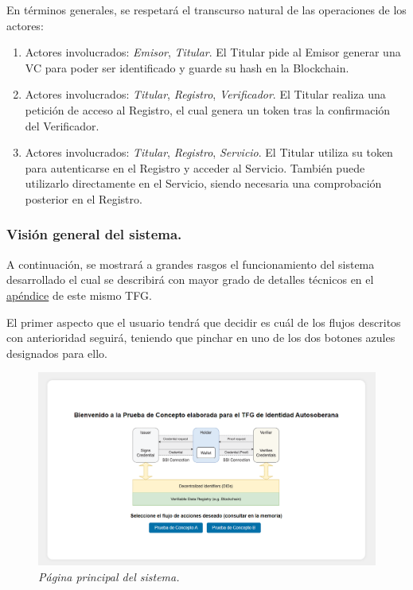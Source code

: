 \documentclass[../main.tex]{subfiles}
\begin{document}
\newpage

\noindent En términos generales, se respetará el transcurso natural de las operaciones de los actores:

\begin{enumerate}[label=\textbf{Paso \arabic*.}, leftmargin=5em]
    \item Actores involucrados: \textit{Emisor}, \textit{Titular}. El Titular pide al Emisor generar una \acrshort{VC} para poder ser identificado y guarde su \Gls{hash} en la Blockchain. 
    \item Actores involucrados: \textit{Titular}, \textit{Registro}, \textit{Verificador}. El Titular realiza una petición de acceso al Registro, el cual genera un token tras la confirmación del Verificador. 
    \item Actores involucrados: \textit{Titular}, \textit{Registro}, \textit{Servicio}. El Titular utiliza su token para autenticarse en el Registro y acceder al Servicio. También puede utilizarlo directamente en el Servicio, siendo necesaria una comprobación posterior en el Registro. 
\end{enumerate}


\subsubsection{Visión general del sistema.}\label{Visión general del sistema}
A continuación, se mostrará a grandes rasgos el funcionamiento del sistema desarrollado el cual se describirá con mayor grado de detalles técnicos en el \hyperref[Configuración de la prueba de concepto]{apéndice} de este mismo \acrshort{TFG}. 

\noindent El primer aspecto que el usuario tendrá que decidir es cuál de los flujos descritos con anterioridad seguirá, teniendo que pinchar en uno de los dos botones azules designados para ello.
\\

\begin{figure}[htbp]
    \centering
    \includegraphics[width=1\linewidth]{images/design/landing.png}
    \caption{\textit{Página principal del sistema.}}
\end{figure}
\end{document}
